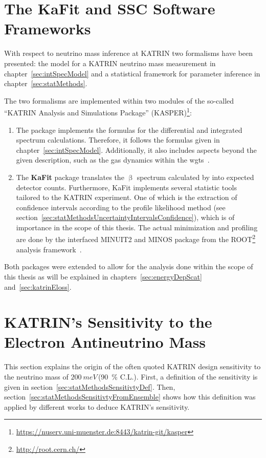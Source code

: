 \section{The KaFit and SSC Software Frameworks}
\label{sec:statMethodsKaFitSSC}
With respect to neutrino mass inference at KATRIN two formalisms have been presented: the model for a KATRIN neutrino mass measurement in chapter~\ref{sec:intSpecModel} and a statistical framework for parameter inference in chapter~\ref{sec:statMethods}. 

The two formalisms are implemented within two modules of the so-called ``KATRIN Analysis and Simulations Package'' (KASPER)\footnote{\url{https://nuserv.uni-muenster.de:8443/katrin-git/kasper}}:
\begin{enumerate}
	\item The \textbf{} package implements the formulas for the differential and integrated spectrum calculations. Therefore, it follows the formulas given in chapter~\ref{sec:intSpecModel}. Additionally, it also includes aspects beyond the given description, such as the gas dynamics within the \gls{wgts}~\cite{Hoetzel2012, Groh2015, Kleesiek2019, Kaefer2012}.
	\item The \textbf{KaFit} package translates the $\upbeta$ spectrum calculated by  into expected detector counts. Furthermore, KaFit implements several statistic tools tailored to the KATRIN experiment. One of which is the extraction of confidence intervals according to the profile likelihood method (see section~\ref{sec:statMethodsUncertaintyIntervalsConfidence}), which is of importance in the scope of this thesis. The actual minimization and profiling are done by the interfaced MINUIT2 and MINOS package from the ROOT\footnote{\url{http://root.cern.ch/}}~\cite{ANTCHEVA2009} analysis framework~\cite{Kleesiek2014}.
\end{enumerate}

Both packages were extended to allow for the analysis done within the scope of this thesis as will be explained in chapters~\ref{sec:energyDepScat} and~\ref{sec:katrinEloss}.




\section{KATRIN's Sensitivity to the Electron Antineutrino Mass}
\label{sec:statMethodsKatrinSensitivity}
This section explains the origin of the often quoted KATRIN design sensitivity to the neutrino mass of $\SI{200}{meV}$\,(\SI{90}{\percent} C.L.). First, a definition of the sensitivity is given in section~\ref{sec:statMethodsSensitivtyDef}. Then, section~\ref{sec:statMethodsSensitivtyFromEnsemble} shows how this definition was applied by different works to deduce KATRIN's sensitivity.

